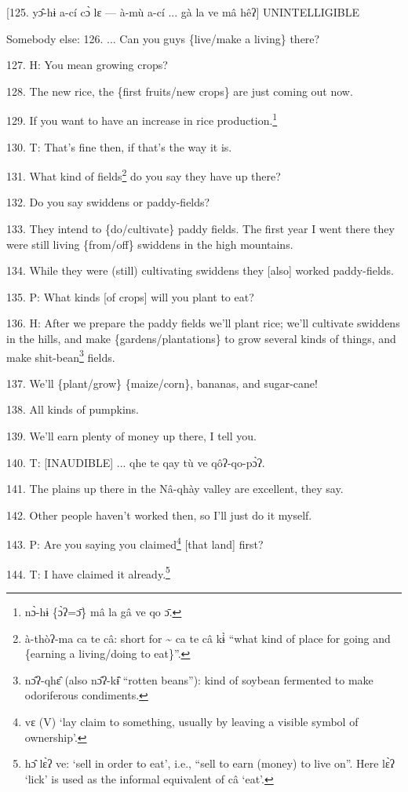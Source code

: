 [125. yɔ̂-hɨ a-cí cɔ̀ lɛ --- à-mù a-cí ... gà la ve mâ hêʔ] UNINTELLIGIBLE

Somebody else: 126. ... Can you guys \{live/make a living\} there?

127. H: You mean growing crops?

128. The new rice, the \{first fruits/new crops\} are just coming out now.

129. If you want to have an increase in rice production.\footnote{nɔ̀-hɨ \{ɔ̀ʔ=ɔ̄\} mâ la gâ ve qo ɔ̄.}

130. T: That's fine then, if that's the way it is.

131. What kind of fields\footnote{à-thòʔ-ma ca te câ: short for \textasciitilde{} ca te câ kɨ̀ ``what kind of place for going and \{earning a living/doing to eat\}''.} do you say they have up there?

132. Do you say swiddens or paddy-fields?

133. They intend to \{do/cultivate\} paddy fields. The first year I went there
they were still living \{from/off\} swiddens in the high mountains.

134. While they were (still) cultivating swiddens they [also] worked paddy-fields.

135. P: What kinds [of crops] will you plant to eat?

136. H: After we prepare the paddy fields we'll plant rice; we'll cultivate swiddens
in the hills, and make \{gardens/plantations\} to grow several kinds of things,
and make shit-bean\footnote{nɔ̂ʔ-qhɛ̂ (also nɔ̂ʔ-kɨ̂ ``rotten beans''): kind of soybean fermented to make odoriferous condiments.} fields.

137. We'll \{plant/grow\} \{maize/corn\}, bananas, and sugar-cane!

138. All kinds of pumpkins.

139. We'll earn plenty of money up there, I tell you.

140. T: [INAUDIBLE] ... qhe te qay tù ve qôʔ-qo-pɔ̀ʔ.

141. The plains up there in the Nâ-qhày valley are excellent, they say.

142. Other people haven't worked then, so I'll just do it myself.

143. P: Are you saying you claimed\footnote{vɛ (V) `lay claim to something, usually by leaving a visible symbol of ownership'.} [that land] first?

144. T: I have claimed it already.\footnote{hɔ̂ lɛ̀ʔ ve: `sell in order to eat', i.e., ``sell to earn (money) to live on''. Here lɛ̀ʔ `lick' is used as the informal equivalent of câ `eat'.}


